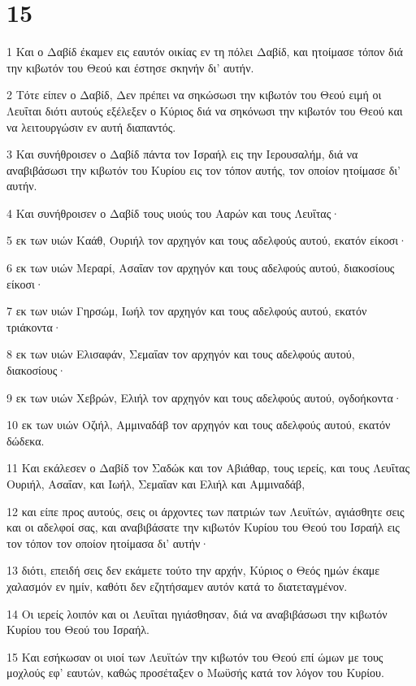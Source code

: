 \chapter{15}

\par 1 Και ο Δαβίδ έκαμεν εις εαυτόν οικίας εν τη πόλει Δαβίδ, και ητοίμασε τόπον διά την κιβωτόν του Θεού και έστησε σκηνήν δι' αυτήν.
\par 2 Τότε είπεν ο Δαβίδ, Δεν πρέπει να σηκώσωσι την κιβωτόν του Θεού ειμή οι Λευΐται διότι αυτούς εξέλεξεν ο Κύριος διά να σηκόνωσι την κιβωτόν του Θεού και να λειτουργώσιν εν αυτή διαπαντός.
\par 3 Και συνήθροισεν ο Δαβίδ πάντα τον Ισραήλ εις την Ιερουσαλήμ, διά να αναβιβάσωσι την κιβωτόν του Κυρίου εις τον τόπον αυτής, τον οποίον ητοίμασε δι' αυτήν.
\par 4 Και συνήθροισεν ο Δαβίδ τους υιούς του Ααρών και τους Λευΐτας·
\par 5 εκ των υιών Καάθ, Ουριήλ τον αρχηγόν και τους αδελφούς αυτού, εκατόν είκοσι·
\par 6 εκ των υιών Μεραρί, Ασαΐαν τον αρχηγόν και τους αδελφούς αυτού, διακοσίους είκοσι·
\par 7 εκ των υιών Γηρσώμ, Ιωήλ τον αρχηγόν και τους αδελφούς αυτού, εκατόν τριάκοντα·
\par 8 εκ των υιών Ελισαφάν, Σεμαΐαν τον αρχηγόν και τους αδελφούς αυτού, διακοσίους·
\par 9 εκ των υιών Χεβρών, Ελιήλ τον αρχηγόν και τους αδελφούς αυτού, ογδοήκοντα·
\par 10 εκ των υιών Οζιήλ, Αμμιναδάβ τον αρχηγόν και τους αδελφούς αυτού, εκατόν δώδεκα.
\par 11 Και εκάλεσεν ο Δαβίδ τον Σαδώκ και τον Αβιάθαρ, τους ιερείς, και τους Λευΐτας Ουριήλ, Ασαΐαν, και Ιωήλ, Σεμαΐαν και Ελιήλ και Αμμιναδάβ,
\par 12 και είπε προς αυτούς, σεις οι άρχοντες των πατριών των Λευϊτών, αγιάσθητε σεις και οι αδελφοί σας, και αναβιβάσατε την κιβωτόν Κυρίου του Θεού του Ισραήλ εις τον τόπον τον οποίον ητοίμασα δι' αυτήν·
\par 13 διότι, επειδή σεις δεν εκάμετε τούτο την αρχήν, Κύριος ο Θεός ημών έκαμε χαλασμόν εν ημίν, καθότι δεν εζητήσαμεν αυτόν κατά το διατεταγμένον.
\par 14 Οι ιερείς λοιπόν και οι Λευΐται ηγιάσθησαν, διά να αναβιβάσωσι την κιβωτόν Κυρίου του Θεού του Ισραήλ.
\par 15 Και εσήκωσαν οι υιοί των Λευϊτών την κιβωτόν του Θεού επί ώμων με τους μοχλούς εφ' εαυτών, καθώς προσέταξεν ο Μωϋσής κατά τον λόγον του Κυρίου.
